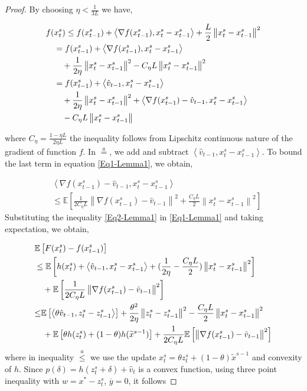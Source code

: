 \documentclass{article}
\newcommand*{\E}{\mathbb{E}}
\newcommand{\norm}[1]{\left\lVert#1\right\rVert}
\newcommand{\Iprod}[2]{\left\langle #1,#2\right\rangle}
\theoremstyle{definition}
\theoremstyle{remark}
\begin{document}
{
\begin{proof}
By choosing $\eta < \frac{1}{3L}$ we have,


\begin{align}
\label{Eq1-Lemma1}
f(&x_{t}^s)  \leq f(x_{t-1}^s) + \Iprod{\nabla f(x_{t-1}^s)}{x_{t}^s-x_{t-1}^s}+\frac{L}{2}\norm{x_{t}^s-x_{t-1}^s}^2\notag\\
&=f(x_{t-1}^s) + \Iprod{\nabla f(x_{t-1}^s)}{x_{t}^s-x_{t-1}^s}\notag\\
&~~~+ {\frac{1 }{2\eta}}\norm{x_{t}^s-x_{t-1}^s}^2-{C_{\eta} L}\norm{x_{t}^s-x_{t-1}^s}^2\\
&= f(x_{t-1}^s) + \Iprod{\hat{v}_{t-1}}{x_{t}^s-x_{t-1}^s}\notag\\
&~~~+ { \frac{1}{2\eta}}\norm{x_{t}^s-x_{t-1}^s}^2+\Iprod{\nabla f(x_{t-1}^s)-\hat{v}_{t-1}}{x_{t}^s-x_{t-1}^s}\notag\\
&~~~-{C_{\eta} L}\norm{x_{t}^s-x_{t-1}^s}
\end{align}

where $C_{\eta} = \frac{1-\eta L}{2\eta L}$ the inequality follows from Lipschitz continuous nature of the gradient of function $f$. In $\stackrel{a}{=}$, we add and subtract $\Iprod{\hat{v}_{t-1}}{x_{t}^s-x_{t-1}^s}$. 
To bound the last term in equation \eqref{Eq1-Lemma1}, we obtain,

\begin{equation}\label{Eq2-Lemma1}
\begin{split}
&\Iprod{\nabla f(x_{t-1}^s)-\hat{v}_{t-1}}{x_{t}^s-x_{t-1}^s}\\
&{\leq} \E\left[\frac{1}{2C_{\eta} L}\norm{\nabla f(x_{t-1}^s)-\hat{v}_{t-1}}^2 + \frac{C_{\eta} L}{2}\norm{x_{t}^s-x_{t-1}^s}^2\right]
\end{split}
\end{equation}
Substituting the inequality \eqref{Eq2-Lemma1} in \eqref{Eq1-Lemma1} and taking expectation, we obtain,


\begin{align}\label{Eq3-Lemma1-1}
&\E \left[ F(x_{t}^s) -f(x_{t-1}^s)\right]\notag\\
&\leq \E\left[h(x_{t}^s)+ \Iprod{\hat{v}_{t-1}}{x_{t}^s-x_{t-1}^s}+{(\frac{1}{2\eta}-\frac{C_{\eta} L}{2})}\norm{x_{t}^s-x_{t-1}^s}^2\right]\notag\\
&~~~+\E\left[\frac{1}{2C_{\eta} L}\norm{\nabla f(x_{t-1}^s)-\hat{v}_{t-1}}^2\right]\notag\\
&{\leq}\E\left[\Iprod{\theta\hat{v}_{t-1}}{z_{t}^s-z_{t-1}^s}\right]+{\frac{{ \theta^2}}{2\eta}}\norm{z_{t}^s-z_{t-1}^s}^2-\frac{C_{\eta} L}{2}\norm{x_{t}^s-x_{t-1}^s}^2\notag\\
&~~~+\E\left[\theta h(z_{t}^s)+(1-\theta) h(\widetilde{x}^{s-1})\right]+\frac{1}{2C_{\eta} L}\E\left[\norm{\nabla f(x_{t-1}^s)-\hat{v}_{t-1}}^2\right]
\end{align}
where in inequality $\stackrel{a}{\leq}$ we use the update $x_t^s = \theta z_t^s+(1-\theta)\widetilde{x}^{s-1}$ and convexity of $h$. Since   $p(\delta) = h(z_t^s+\delta)+\hat{v}_{t}$ is a convex function, using {\color{blue}three point inequality} with $w=x^*-z_{t}^s$, $\overline{y} = 0$, it follows


\end{proof}}
\end{document}
